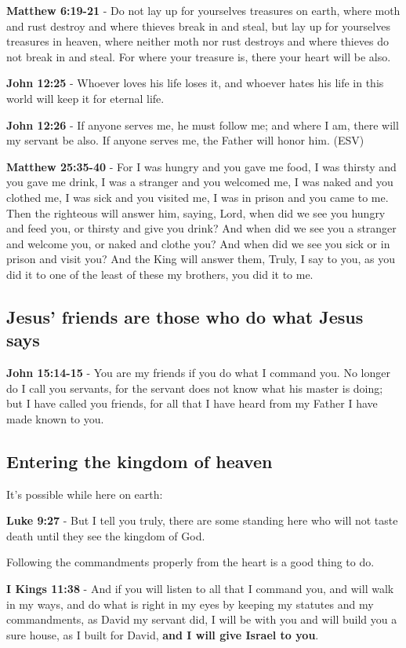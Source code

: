 \documentclass[11pt]{article}
\begin{document}
\textbf{Matthew 6:19-21} - Do not lay up for yourselves treasures on earth, where moth and rust destroy and where thieves break in and steal, but lay up for yourselves treasures in heaven, where neither moth nor rust destroys and where thieves do not break in and steal. For where your treasure is, there your heart will be also.

\textbf{John 12:25} - Whoever loves his life loses it, and whoever hates his life in this world will keep it for eternal life.

\textbf{John 12:26} - If anyone serves me, he must follow me; and where I am, there will my servant be also. If anyone serves me, the Father will honor him. (ESV)

\textbf{Matthew 25:35-40} - For I was hungry and you gave me food, I was thirsty and you gave me drink, I was a stranger and you welcomed me, I was naked and you clothed me, I was sick and you visited me, I was in prison and you came to me. Then the righteous will answer him, saying, Lord, when did we see you hungry and feed you, or thirsty and give you drink? And when did we see you a stranger and welcome you, or naked and clothe you? And when did we see you sick or in prison and visit you? And the King will answer them, Truly, I say to you, as you did it to one of the least of these my brothers, you did it to me.

\subsection{Jesus' friends are those who do what Jesus says}
\label{sec:orgd76dce7}
\textbf{John 15:14-15} - You are my friends if you do what I command you. No longer do I call you servants, for the servant does not know what his master is doing; but I have called you friends, for all that I have heard from my Father I have made known to you.

\subsection{Entering the kingdom of heaven}
\label{sec:orgeb3e9f8}
It's possible while here on earth:

\textbf{Luke 9:27} - But I tell you truly, there are some standing here who will not taste death until they see the kingdom of God.

Following the commandments properly from the heart is a good thing to do.

\textbf{I Kings 11:38} - And if you will listen to all that I command you, and will walk in my ways, and do what is right in my eyes by keeping my statutes and my commandments, as David my servant did, I will be with you and will build you a sure house, as I built for David, \textbf{and I will give Israel to you}.
\end{document}
